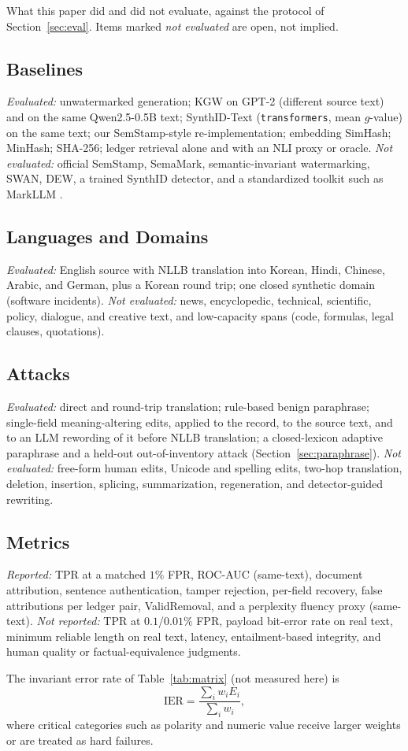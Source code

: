 \documentclass[11pt]{article}
\begin{document}
\label{app:protocol}
What this paper did and did not evaluate, against the protocol of
Section~\ref{sec:eval}. Items marked \emph{not evaluated} are open, not implied.

\subsection{Baselines}
\emph{Evaluated:} unwatermarked generation; KGW on GPT-2 (different source text) and on the same Qwen2.5-0.5B text; SynthID-Text (\texttt{transformers}, mean $g$-value) on the same text; our SemStamp-style re-implementation; embedding SimHash; MinHash; SHA-256; ledger retrieval alone and with an NLI proxy or oracle. \emph{Not evaluated:} official SemStamp, SemaMark, semantic-invariant watermarking, SWAN, DEW, a trained SynthID detector, and a standardized toolkit such as MarkLLM \cite{pan2024markllm}.

\subsection{Languages and Domains}
\emph{Evaluated:} English source with NLLB translation into Korean, Hindi, Chinese, Arabic, and German, plus a Korean round trip; one closed synthetic domain (software incidents). \emph{Not evaluated:} news, encyclopedic, technical, scientific, policy, dialogue, and creative text, and low-capacity spans (code, formulas, legal clauses, quotations).

\subsection{Attacks}
\emph{Evaluated:} direct and round-trip translation; rule-based benign paraphrase; single-field meaning-altering edits, applied to the record, to the source text, and to an LLM rewording of it before NLLB translation; a closed-lexicon adaptive paraphrase and a held-out out-of-inventory attack (Section~\ref{sec:paraphrase}). \emph{Not evaluated:} free-form human edits, Unicode and spelling edits, two-hop translation, deletion, insertion, splicing, summarization, regeneration, and detector-guided rewriting.

\subsection{Metrics}
\emph{Reported:} TPR at a matched $1\%$ FPR, ROC-AUC (same-text), document attribution, sentence authentication, tamper rejection, per-field recovery, false attributions per ledger pair, ValidRemoval, and a perplexity fluency proxy (same-text). \emph{Not reported:} TPR at $0.1$/$0.01\%$ FPR, payload bit-error rate on real text, minimum reliable length on real text, latency, entailment-based integrity, and human quality or factual-equivalence judgments.

The invariant error rate of Table~\ref{tab:matrix} (not measured here) is
\begin{equation}
\mathrm{IER}=\frac{\sum_i w_iE_i}{\sum_i w_i},
\end{equation}
where critical categories such as polarity and numeric value receive larger weights or are treated as hard failures.
\end{document}
